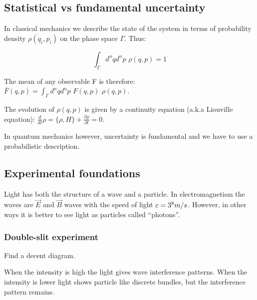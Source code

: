 \subsection{Statistical vs fundamental uncertainty}

In classical mechanics we describe the state of the system in terms of probability density $\rho (q_i, p_i)$ on the phase space $\Gamma$. Thus:

$$\int_{\Gamma} d^n q d^n p \, \, \rho (q,p) = 1$$

The mean of any observable F is therefore: $\bar{F} (q,p) = \int_{\Gamma} d^n q d^n p \, \, F(q,p)  \, \, \rho(q,p)$.

The evolution of $\rho (q,p)$ is given by a continuity equation (a.k.a Liouville equation): $\frac{d}{dt} \rho = \{\rho, H\} + \frac{\partial \rho}{\partial t} = 0$.

In quantum mechanics however, uncertainty is fundamental and we have to use a probabilistic description. 

\subsection{Experimental foundations}

Light has both the structure of a wave and a particle. In electromagnetism the waves are $\vec{E}$ and $\vec{B}$ waves with the speed of light $c = 3 \time 10^8 m/s$. However, in other ways it is better to see light as particles called ``photons''.

\subsubsection{Double-slit experiment}

Find a decent diagram.

When the intensity is high the light gives wave interference patterns. When the intensity is lower light shows particle like discrete bundles, but the interference pattern remains.